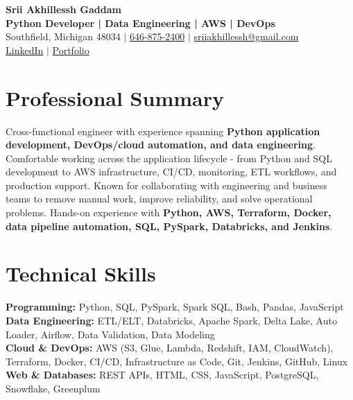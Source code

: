 \documentclass[letterpaper,10pt]{article}
\begin{document}
\fontsize{9.35pt}{10.45pt}\selectfont

\begin{center}
    {\LARGE \textbf{Srii Akhillessh Gaddam}} \\[-1pt]
    \textbf{Python Developer | Data Engineering | AWS | DevOps} \\[2pt]
    Southfield, Michigan 48034 $|$
    \href{tel:6468752400}{646-875-2400} $|$
    \href{mailto:sriiakhillessh@gmail.com}{sriiakhillessh@gmail.com} \\[1pt]
    \href{https://www.linkedin.com/in/srii-akhiilessh-gaddam-b48668191/}{LinkedIn} $|$
    \href{https://sriiakhillesshg.github.io/portfolio/}{Portfolio}
\end{center}
\vspace{-8pt}

\section{Professional Summary}
\small{Cross-functional engineer with experience spanning \textbf{Python application development, DevOps/cloud automation, and data engineering}. Comfortable working across the application lifecycle - from Python and SQL development to AWS infrastructure, CI/CD, monitoring, ETL workflows, and production support. Known for collaborating with engineering and business teams to remove manual work, improve reliability, and solve operational problems. Hands-on experience with \textbf{Python, AWS, Terraform, Docker, data pipeline automation, SQL, PySpark, Databricks, and Jenkins}.}

\section{Technical Skills}
\small{
\textbf{Programming:} Python, SQL, PySpark, Spark SQL, Bash, Pandas, JavaScript \\
\textbf{Data Engineering:} ETL/ELT, Databricks, Apache Spark, Delta Lake, Auto Loader, Airflow, Data Validation, Data Modeling \\
\textbf{Cloud \& DevOps:} AWS (S3, Glue, Lambda, Redshift, IAM, CloudWatch), Terraform, Docker, CI/CD, Infrastructure as Code, Git, Jenkins, GitHub, Linux \\
\textbf{Web \& Databases:} REST APIs, HTML, CSS, JavaScript, PostgreSQL, Snowflake, Greenplum
}
\end{document}
